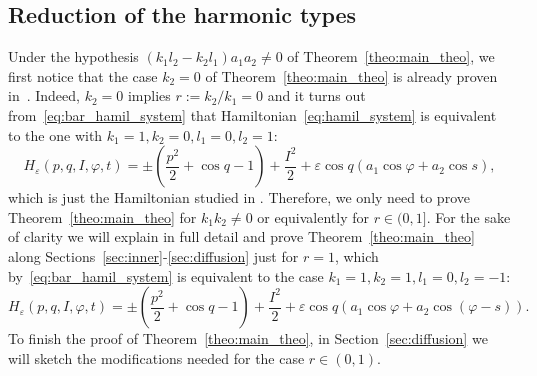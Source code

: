 \documentclass[a4paper,10pt]{article}
\theoremstyle{definition}
\begin{document}
\subsection{Reduction of the harmonic types}
Under the hypothesis $\left(k_1 l_2-k_2 l_1\right) a_1 a_2\neq 0$ of Theorem~\ref{theo:main_theo}, we first
notice that the case $k_2 = 0 $ of Theorem~\ref{theo:main_theo} is already proven in~\cite{Delshams2017}.
Indeed, $k_2 = 0 $ implies $r:=k_2/k_1 = 0$ and it turns out from~\eqref{eq:bar_hamil_system} that Hamiltonian~\eqref{eq:hamil_system}
is equivalent to the one with $k_1=1, k_2 = 0,l_1=0,l_2= 1$:
\begin{equation}
H_{\varepsilon}(p , q , I , \varphi , t) = \pm\left( \frac{p^2}{2} + \cos q  -1 \right) + \frac{I^2}{2}
+ \varepsilon \cos q \left(a_1 \cos \varphi + a_2\cos s\right),
\label{eq:old_hamil_system}
\end{equation}
which is just the Hamiltonian studied in \cite{Delshams2017}.
Therefore, we only need to prove
Theorem~\ref{theo:main_theo} for $k_1 k_2 \neq 0$ or equivalently for $r\in (0,1]$.
For the sake of clarity we will explain in full detail and prove Theorem~\ref{theo:main_theo}
along Sections~\ref{sec:inner}-\ref{sec:diffusion} just for $r=1$, which by~\eqref{eq:bar_hamil_system}
is equivalent to the case $k_1=1, k_2 = 1,l_1=0,l_2 = -1$:
\begin{equation}
H_{\varepsilon}(p , q , I , \varphi , t) = \pm\left( \frac{p^2}{2} + \cos q  -1 \right) + \frac{I^2}{2}
+ \varepsilon \cos q \left(a_1 \cos \varphi + a_2\cos (\varphi - s)\right).
\label{eq:new_hamil_system}
\end{equation}
To finish the proof of Theorem~\ref{theo:main_theo}, in Section~\ref{sec:diffusion} we will sketch the
modifications needed for the case $r\in (0,1)$.
\end{document}
